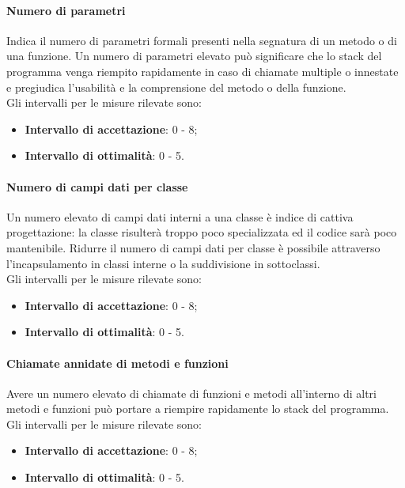 \paragraph{Numero di parametri}
Indica il numero di parametri formali presenti nella segnatura di un metodo o di una funzione. Un numero di parametri elevato può significare che lo stack del programma venga riempito rapidamente in caso di chiamate multiple o innestate e pregiudica l’usabilità e la comprensione del metodo o della funzione.\\
Gli intervalli per le misure rilevate sono:
\begin{itemize}
\item \textbf{Intervallo di accettazione}: 0 - 8;
\item \textbf{Intervallo di ottimalità}: 0 - 5.
\end{itemize}

\paragraph{Numero di campi dati per classe}
Un numero elevato di campi dati interni a una classe è indice di cattiva progettazione: la classe risulterà troppo poco specializzata ed il codice sarà poco mantenibile. Ridurre il numero di campi dati per classe è possibile attraverso l’incapsulamento in classi interne o la suddivisione in sottoclassi.\\
Gli intervalli per le misure rilevate sono:
\begin{itemize}
\item \textbf{Intervallo di accettazione}: 0 - 8;
\item \textbf{Intervallo di ottimalità}: 0 - 5.
\end{itemize}

\paragraph{Chiamate annidate di metodi e funzioni}
Avere un numero elevato di chiamate di funzioni e metodi all’interno di altri metodi e funzioni può portare a riempire rapidamente lo stack del programma.\\
Gli intervalli per le misure rilevate sono:
\begin{itemize}
\item \textbf{Intervallo di accettazione}: 0 - 8;
\item \textbf{Intervallo di ottimalità}: 0 - 5.
\end{itemize}

